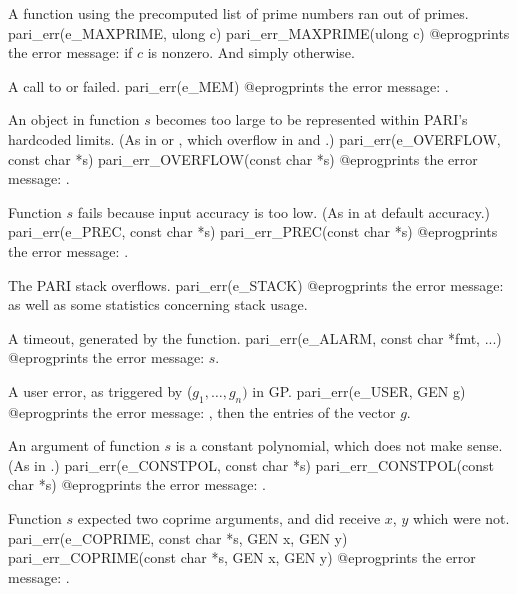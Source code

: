  A function using the precomputed list of prime numbers
ran out of primes.
\bprog
  pari_err(e_MAXPRIME, ulong c)
  pari_err_MAXPRIME(ulong c)
@eprog\noindent prints the error message:  if $c$ is nonzero. And simply  otherwise.

 A call to  or  failed.
\bprog
  pari_err(e_MEM)
@eprog\noindent prints the error message: .

 An object in function $s$ becomes too large to be
represented within PARI's hardcoded limits. (As in 
or , which overflow in  and .)
\bprog
  pari_err(e_OVERFLOW, const char *s)
  pari_err_OVERFLOW(const char *s)
@eprog\noindent prints the error message: .

 Function $s$ fails because input accuracy is too low.
(As in  at default accuracy.)
\bprog
  pari_err(e_PREC, const char *s)
  pari_err_PREC(const char *s)
@eprog\noindent prints the error message: .

 The PARI stack overflows.
\bprog
  pari_err(e_STACK)
@eprog\noindent prints the error message: 
as well as some statistics concerning stack usage.


 A timeout, generated by the  function.
\bprog
  pari_err(e_ALARM, const char *fmt, ...)
@eprog\noindent prints the error message: $s$.

 A user error, as triggered by ($g_1,\dots,g_n)$
in GP.
\bprog
  pari_err(e_USER, GEN g)
@eprog\noindent prints the error message: , then the
entries of the vector $g$.


 An argument of function $s$ is a constant polynomial,
which does not make sense. (As in .)
\bprog
  pari_err(e_CONSTPOL, const char *s)
  pari_err_CONSTPOL(const char *s)
@eprog\noindent prints the error message: .

 Function $s$ expected two coprime arguments, and did
receive $x$, $y$ which were not.
\bprog
  pari_err(e_COPRIME, const char *s, GEN x, GEN y)
  pari_err_COPRIME(const char *s, GEN x, GEN y)
@eprog\noindent prints the error message: .

